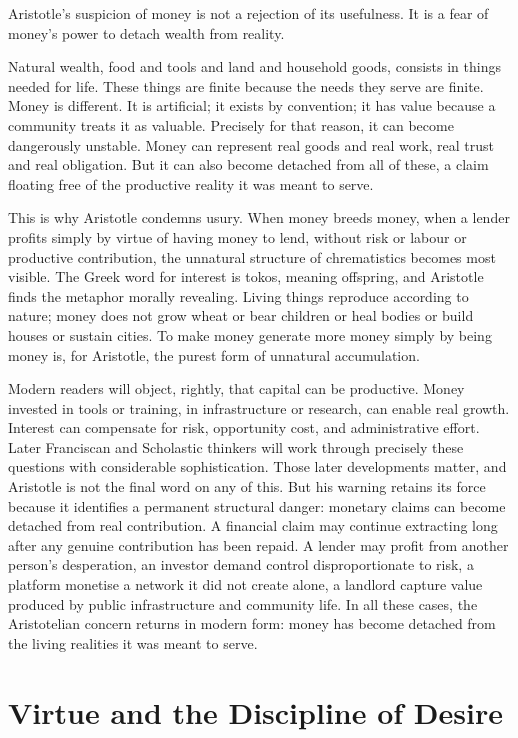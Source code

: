 \documentclass[11pt,a4paper,oneside]{book}
\begin{document}
Aristotle's suspicion of money is not a rejection of its usefulness. It is a fear of money's power to detach wealth from reality.

Natural wealth, food and tools and land and household goods, consists in things needed for life. These things are finite because the needs they serve are finite. Money is different. It is artificial; it exists by convention; it has value because a community treats it as valuable. Precisely for that reason, it can become dangerously unstable. Money can represent real goods and real work, real trust and real obligation. But it can also become detached from all of these, a claim floating free of the productive reality it was meant to serve.

This is why Aristotle condemns usury. When money breeds money, when a lender profits simply by virtue of having money to lend, without risk or labour or productive contribution, the unnatural structure of chrematistics becomes most visible. The Greek word for interest is tokos, meaning offspring, and Aristotle finds the metaphor morally revealing. Living things reproduce according to nature; money does not grow wheat or bear children or heal bodies or build houses or sustain cities. To make money generate more money simply by being money is, for Aristotle, the purest form of unnatural accumulation.

Modern readers will object, rightly, that capital can be productive. Money invested in tools or training, in infrastructure or research, can enable real growth. Interest can compensate for risk, opportunity cost, and administrative effort. Later Franciscan and Scholastic thinkers will work through precisely these questions with considerable sophistication. Those later developments matter, and Aristotle is not the final word on any of this. But his warning retains its force because it identifies a permanent structural danger: monetary claims can become detached from real contribution. A financial claim may continue extracting long after any genuine contribution has been repaid. A lender may profit from another person's desperation, an investor demand control disproportionate to risk, a platform monetise a network it did not create alone, a landlord capture value produced by public infrastructure and community life. In all these cases, the Aristotelian concern returns in modern form: money has become detached from the living realities it was meant to serve.

\section*{Virtue and the Discipline of Desire}
\end{document}
